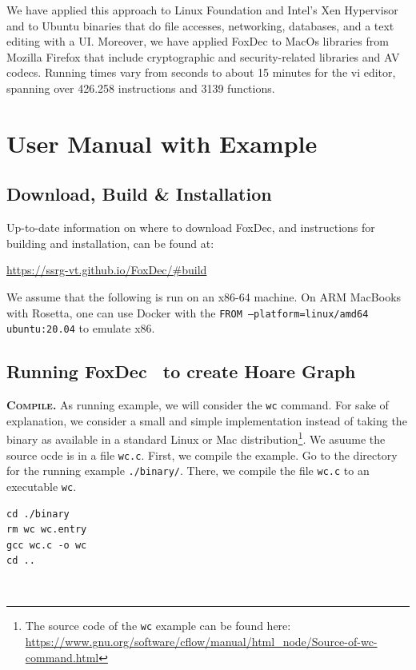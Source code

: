 \documentclass[12pt,a4paper]{article}
\newcommand{\begincodebox}[1]{
\vspace{1ex}
\begin{tcolorbox}[
    enhanced,
    attach boxed title to top left={xshift=6mm,yshift=-3mm},
    colback=moonstoneblue!20,
    colframe=moonstoneblue,
    colbacktitle=moonstoneblue,
    title=#1,
    fonttitle=\bfseries\color{black},
    boxed title style={size=small,colframe=moonstoneblue,sharp corners},
    sharp corners,
]
}
\newcommand{\codeboxend}{\end{tcolorbox}\noindent}
\newcommand{\foxdec}{\textsf{FoxDec}}
\newcommand{\beginpar}[1]{\noindent\textsc{\textbf{#1.}}}
\newcounter{example}
\begin{document}
We have applied this approach to Linux Foundation and Intel’s Xen Hypervisor and to Ubuntu binaries that do file accesses, networking, databases, and a text editing with a UI.
Moreover, we have applied FoxDec to MacOs libraries from Mozilla Firefox that include cryptographic and security-related libraries and AV codecs.
Running times vary from seconds to about 15 minutes for the vi editor, spanning over 426.258 instructions and 3139 functions.





\section{User Manual with Example}


\subsection{Download, Build \& Installation}

Up-to-date information on where to download \foxdec, and instructions for building and installation, can be found at:
\begin{center}
\url{https://ssrg-vt.github.io/FoxDec/#build}
\end{center}

We assume that the following is run on an x86-64 machine. On ARM MacBooks with Rosetta, one can use Docker with the \texttt{FROM --platform=linux/amd64 ubuntu:20.04} to emulate x86.

\subsection{Running \foxdec~ to create Hoare Graph}

\beginpar{Compile} As running example, we will consider the \texttt{wc} command.
For sake of explanation, we consider a small and simple implementation instead of taking the binary as available in a standard Linux or Mac distribution\footnote{The source code of the \texttt{wc} example can be found here:\\\url{https://www.gnu.org/software/cflow/manual/html_node/Source-of-wc-command.html}}.
We asuume the source ocde is in a file \texttt{wc.c}.
First, we compile the example. 
Go to the directory for the running example \texttt{./binary/}.
There, we compile the file \texttt{wc.c} to an executable \texttt{wc}.

\begincodebox{Compile the running example}
\begin{verbatim}
cd ./binary
rm wc wc.entry
gcc wc.c -o wc
cd ..
\end{verbatim}
\codeboxend
\\
\end{document}
